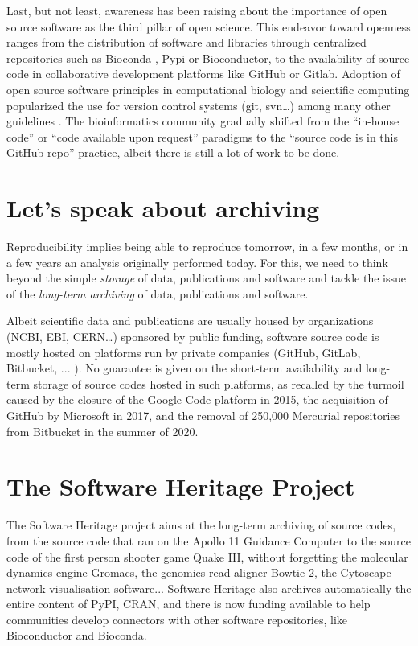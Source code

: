 \documentclass[long, final]{jobim}
\begin{document}
Last, but not least, awareness has been raising about the importance of open source software as the third pillar of open science. This endeavor toward openness ranges from the distribution of software and libraries through centralized repositories such as Bioconda \cite{gruning2018a}, Pypi or Bioconductor, to the availability of source code in collaborative development platforms like GitHub or Gitlab. Adoption of open source software principles in computational biology and scientific computing popularized the use for version control systems (git, svn\ldots) among many other guidelines \cite{wilson2014,taschuk2017,jimenez2017}. The bioinformatics community gradually shifted from the “in-house code” or “code available upon request” paradigms to the “source code is in this GitHub repo” practice, albeit there is still a lot of work to be done\cite{cadwallader2021}.


\section{Let’s speak about archiving}
\label{sec:archiving}

Reproducibility implies being able to reproduce tomorrow, in a few months, or in a few years an analysis originally performed today.  For this, we need to think beyond the simple \textit{storage} of data, publications and software and tackle the issue of the \textit{long-term archiving} of data, publications and software. 

Albeit scientific data and publications are usually housed by organizations (NCBI, EBI, CERN…) sponsored by public funding, software source code is mostly hosted on platforms run by private companies (GitHub, GitLab, Bitbucket, ... ). No guarantee is given on the short-term availability and long-term storage of source codes hosted in such platforms, as recalled by the turmoil caused by the closure of the Google Code platform in 2015, the acquisition of GitHub by Microsoft in 2017, and the removal of 250,000 Mercurial repositories from Bitbucket in the summer of 2020.



\section{The Software Heritage Project}
\label{sec:SWH}

The Software Heritage project\cite{dicosmo2017} aims at the long-term archiving of source codes, from the source code that ran on 
the Apollo 11 Guidance Computer\cite{Apollo11AGCsourcecode,TurnLEMaround}
to the source code of the first person shooter game Quake III\cite{QuakeIIIArena,rsqrt}, 
without forgetting the molecular dynamics engine Gromacs\cite{Gromacs,Gromacsv2021.1}, 
the genomics read aligner Bowtie 2\cite{Bowtie2,Bowtie2v242}, 
the Cytoscape\cite{Cytoscape} network visualisation software... 
Software Heritage also archives automatically the entire content of PyPI, CRAN, and there is now funding available to help communities develop connectors with other software repositories, like Bioconductor and Bioconda.
\end{document}
